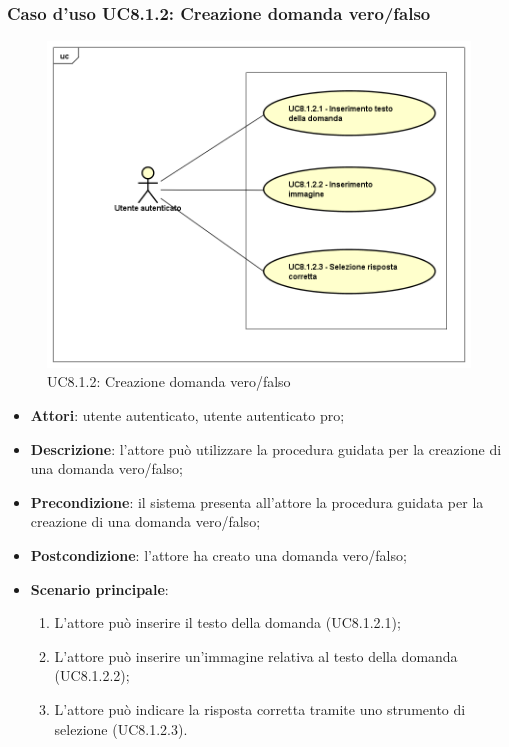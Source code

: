 \subsubsection{Caso d'uso UC8.1.2: Creazione domanda vero/falso}
	\label{UC8.1.2}
	\begin{figure}[ht]
		\centering
			\includegraphics[scale=0.45,keepaspectratio]{UML/UC8_1_2.png}
		\caption{UC8.1.2: Creazione domanda vero/falso}
	\end{figure}
	\FloatBarrier
	\begin{itemize}
		\item
			\textbf{Attori}: utente autenticato, utente autenticato pro;
		\item		
			\textbf{Descrizione}: l'attore può utilizzare la procedura guidata per la creazione di una domanda vero/falso;
		\item
			\textbf{Precondizione}: il sistema presenta all'attore la procedura guidata per la creazione di una domanda vero/falso; 
		\item
			\textbf{Postcondizione}: l'attore ha creato una domanda vero/falso;
		\item
			\textbf{Scenario principale}:
	       		\begin{enumerate}
	       			\item
	       			L'attore può inserire il testo della domanda (UC8.1.2.1);
	       			\item
	       			L'attore può inserire un'immagine relativa al testo della domanda (UC8.1.2.2);
					\item
					L'attore può indicare la risposta corretta tramite uno strumento di selezione (UC8.1.2.3).
	 			\end{enumerate}
	\end{itemize}

